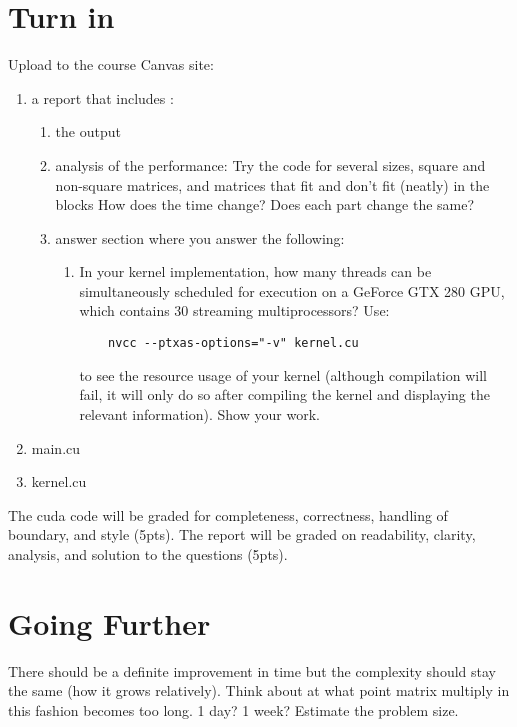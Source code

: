 \documentclass{article}
\begin{document}
\section{Turn in}
Upload to the course Canvas site:
\begin{enumerate}
\item a report that includes :
	\begin{enumerate}
	\item the output 
	\item analysis of the performance: Try the code for several sizes, square and non-square matrices, and matrices that fit and don't fit (neatly) in the blocks  How does the time change?  Does each part change the same?
	\item answer section where you answer the following:
		\begin{enumerate}
		\item In your kernel implementation, how many threads can be simultaneously scheduled for execution on a GeForce GTX 280 GPU, which contains 30 streaming multiprocessors? Use:
\begin{verbatim}
	nvcc --ptxas-options="-v" kernel.cu
\end{verbatim}
to see the resource usage of your kernel (although compilation will fail, it will only do so after compiling the kernel and displaying the relevant information). Show your work.
		\end{enumerate}
	\end{enumerate}
\item main.cu
\item kernel.cu
\end{enumerate} 
The cuda code will be graded for completeness, correctness, handling of boundary, and style (5pts).  The report will be graded on readability, clarity, analysis, and solution to the questions (5pts).


\section{Going Further}
There should be a definite improvement in time but the complexity should stay the same (how it grows relatively).  Think about at what point matrix multiply in this fashion becomes too long.  1 day? 1 week?  Estimate the problem size.  
\end{document}
